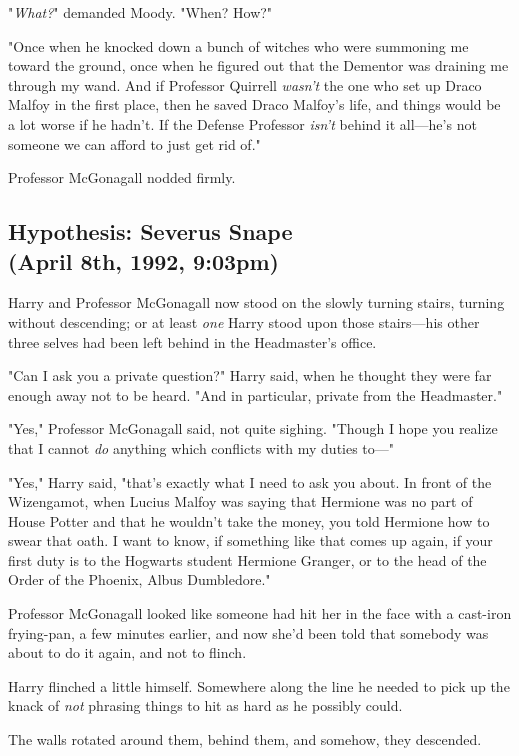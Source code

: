 "\emph{What?}" demanded Moody. "When? How?"

"Once when he knocked down a bunch of witches who were summoning me toward the 
ground, once when he figured out that the Dementor was draining me through my 
wand. And if Professor Quirrell \emph{wasn't} the one who set up Draco Malfoy 
in the first place, then he saved Draco Malfoy's life, and things would be a 
lot worse if he hadn't. If the Defense Professor \emph{isn't} behind it 
all---he's not someone we can afford to just get rid of."

Professor McGonagall nodded firmly.
\sbreak
\subsection{Hypothesis: Severus Snape\\
(April 8th, 1992, 9:03pm)}

Harry and Professor McGonagall now stood on the slowly turning stairs, turning 
without descending; or at least \emph{one} Harry stood upon those stairs---his 
other three selves had been left behind in the Headmaster's office.

"Can I ask you a private question?" Harry said, when he thought they were far 
enough away not to be heard. "And in particular, private from the Headmaster."

"Yes," Professor McGonagall said, not quite sighing. "Though I hope you realize 
that I cannot \emph{do} anything which conflicts with my duties to---"

"Yes," Harry said, "that's exactly what I need to ask you about. In front of 
the Wizengamot, when Lucius Malfoy was saying that Hermione was no part of 
House Potter and that he wouldn't take the money, you told Hermione how to 
swear that oath. I want to know, if something like that comes up again, if your 
first duty is to the Hogwarts student Hermione Granger, or to the head of the 
Order of the Phoenix, Albus Dumbledore."

Professor McGonagall looked like someone had hit her in the face with a 
cast-iron frying-pan, a few minutes earlier, and now she'd been told that 
somebody was about to do it again, and not to flinch.

Harry flinched a little himself. Somewhere along the line he needed to pick up 
the knack of \emph{not} phrasing things to hit as hard as he possibly could.

The walls rotated around them, behind them, and somehow, they descended.

